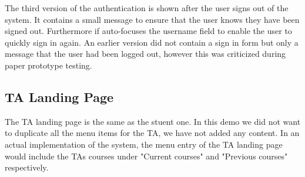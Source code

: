 The third version of the authentication is shown after the user signs out of the system. It contains a small message to ensure that the user knows they have been signed out. Furthermore if auto-focuses the username field to enable the user to quickly sign in again. An earlier version did not contain a sign in form but only a message that the user had been logged out, however this was criticized during paper prototype testing.

\subsection{TA Landing Page}

The TA landing page is the same as the stuent one. In this demo we did not want to duplicate all the menu items for the TA, we have not added any content. In an actual implementation of the system, the menu entry of the TA landing page would include the TAs courses under "Current courses" and "Previous courses" respectively. 
